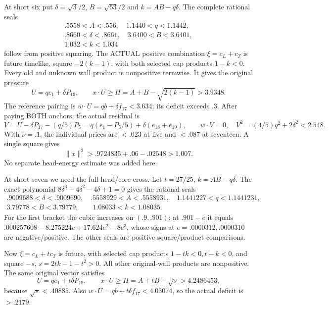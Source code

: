\documentclass[11pt]{article}
\theoremstyle{definition}
\theoremstyle{remark}
\begin{document}
At short six put
\(\delta=\sqrt3/2\), \(B=\sqrt{53}/2\)
and \(k=AB-q\delta\).
The complete rational seals
\[
\begin{gathered}
 .5558<A<.556,\quad1.1440<q<1.1442,\\
 .8660<\delta<.8661,\quad3.6400<B<3.6401,\\
 1.032<k<1.034
\end{gathered}
\]
follow from positive squaring.
The ACTUAL positive combination
\(\xi=c_L+c_T\) is future timelike,
square \(-2(k-1)\), with both
selected cap products \(1-k<0\).
Every old and unknown wall product
is nonpositive termwise.
It gives the original pressure
\[
 U=qe_1+\delta P_{19},\qquad
              x\cdot U\ge H=A+B-\sqrt{2(k-1)}>3.9348 .
\]
The reference pairing is
\(w\cdot U=qb+\delta f_{17}<3.634\);
its deficit exceeds \(.3\).
After paying BOTH anchors, the
actual residual is
\[
 V=U-\delta P_{17}-(q/5)P_5
          =q(e_1-P_5/5)+\delta(e_{18}+e_{19}),\qquad
       w\cdot V=0,\quad V^2=(4/5)q^2+2\delta^2<2.548 .
\]
With \(\nu=.1\), the individual
prices are \(<.023\) at five and
\(<.087\) at seventeen.
A single square gives
\[
                      \|x\|^2>.9724835+.06-.02548>1.007 .
\]
No separate head-energy estimate
was added here.

At short seven we need the full
head/core cross.
Let \(t=27/25\), \(k=AB-q\delta\).
The exact polynomial
\(8\delta^3-4\delta^2-4\delta+1=0\)
gives the rational seals
\[
\begin{gathered}
 .9009688<\delta<.9009690,\quad
 .5558929<A<.5558931,\quad
 1.1441227<q<1.1441231,\\
 3.79778<B<3.79779,\qquad1.08033<k<1.08035 .
\end{gathered}
\]
For the first bracket the cubic
increases on \((.9,.901)\);
at \(.901-e\) it equals
\(.000257608-8.275224e+17.624e^2-8e^3\),
whose signs at \(e=.0000312,.0000310\)
are negative/positive.
The other seals are positive
square/product comparisons.

Now \(\xi=c_L+t c_T\) is future,
with selected cap products
\(1-tk<0,t-k<0\), and square
\(-s\), \(s=2tk-1-t^2>0\).
All other original-wall products
are nonpositive.
The same original vector satisfies
\[
 U=qe_1+t\delta P_{19},\qquad
 x\cdot U\ge H=A+tB-\sqrt s>4.2486453 ,
\]
because \(\sqrt s<.40885\).
Also \(w\cdot U=qb+t\delta f_{17}<4.03074\),
so the actual deficit is \(>.2179\).
\end{document}
